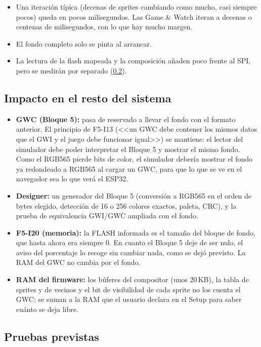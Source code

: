 \begin{itemize}
	\item Una iteración típica (decenas de sprites cambiando como mucho, casi siempre pocos) queda en pocos milisegundos. Las Game \& Watch iteran a decenas o centenas de milisegundos, con lo que hay mucho margen.
	\item El fondo completo solo se pinta al arrancar.
	\item La lectura de la flash mapeada y la composición añaden poco frente al SPI, pero se medirán por separado (\ref{sec:F6I01Pruebas}).
\end{itemize}

\subsection{Impacto en el resto del sistema}
\label{sec:F6I01Impacto}

\begin{itemize}
	\item \textbf{GWC (Bloque 5):} pasa de reservado a llevar el fondo con el formato anterior. El principio de F5-I13 (<<un GWC debe contener los mismos datos que el GWI y el juego debe funcionar igual>>) se mantiene: el lector del simulador debe poder interpretar el Bloque 5 y mostrar el mismo fondo. Como el RGB565 pierde bits de color, el simulador debería mostrar el fondo ya redondeado a RGB565 al cargar un GWC, para que lo que se ve en el navegador sea lo que verá el ESP32.
	\item \textbf{Designer:} un generador del Bloque 5 (conversión a RGB565 en el orden de bytes elegido, detección de 16 o 256 colores exactos, paleta, CRC), y la prueba de equivalencia GWI/GWC ampliada con el fondo.
	\item \textbf{F5-I20 (memoria):} la FLASH informada es el tamaño del bloque de fondo, que hasta ahora era siempre 0. En cuanto el Bloque 5 deje de ser nulo, el aviso del porcentaje lo recoge sin cambiar nada, como se dejó previsto. La RAM del GWC no cambia por el fondo.
	\item \textbf{RAM del firmware:} los búferes del compositor (unos 20\,KB), la tabla de sprites y de vecinos y el bit de visibilidad de cada sprite no los cuenta el GWC; se suman a la RAM que el usuario declara en el Setup para saber cuánto se deja libre.
\end{itemize}

\subsection{Pruebas previstas}
\label{sec:F6I01Pruebas}

